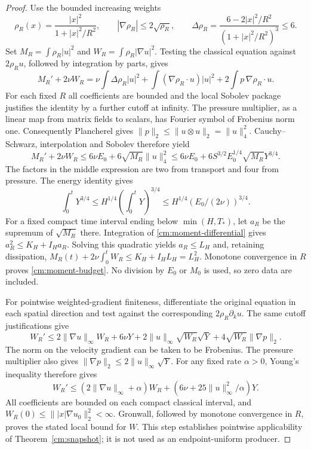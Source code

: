 \begin{proof}
Use the bounded increasing weights
\[
 \rho_R(x)=\frac{|x|^2}{1+|x|^2/R^2},\qquad
 |\nabla\rho_R|\le2\sqrt{\rho_R},\qquad
 \Delta\rho_R=\frac{6-2|x|^2/R^2}{(1+|x|^2/R^2)^3}\le6.
\]
Set $M_R=\int\rho_R|u|^2$ and $W_R=\int\rho_R|\nabla u|^2$.
Testing the classical equation against $2\rho_Ru$, followed by integration
by parts, gives
\[
 M_R'+2\nu W_R
 =\nu\int\Delta\rho_R|u|^2
   +\int(\nabla\rho_R\cdot u)|u|^2
   +2\int p\,\nabla\rho_R\cdot u.
\]
For each fixed $R$ all coefficients are bounded and the local Sobolev
package justifies the identity by a further cutoff at infinity.
The pressure multiplier, as a linear map from matrix fields to scalars,
has Fourier symbol of Frobenius norm one. Consequently Plancherel gives
$\|p\|_2\le\|u\otimes u\|_2=\|u\|_4^2$.
Cauchy--Schwarz, interpolation and Sobolev therefore yield
\begin{equation}\label{cm:moment-differential}
 M_R'+2\nu W_R
 \le6\nu E_0+6\sqrt{M_R}\|u\|_4^2
 \le6\nu E_0+6S^{3/2}E_0^{1/4}\sqrt{M_R}Y^{3/4}.
\end{equation}
The factors in the middle expression are two from transport and four
from pressure. The energy identity gives
\[
 \int_0^tY^{3/4}\le H^{1/4}\left(\int_0^tY\right)^{3/4}
 \le H^{1/4}(E_0/(2\nu))^{3/4}.
\]
For a fixed compact time interval ending below $\min(H,T_*)$, let
$a_R$ be the supremum of $\sqrt{M_R}$ there. Integration of
\eqref{cm:moment-differential} gives $a_R^2\le K_H+I_Ha_R$.
Solving this quadratic yields $a_R\le L_H$ and, retaining dissipation,
$M_R(t)+2\nu\int_0^tW_R\le K_H+I_HL_H=L_H^2$.
Monotone convergence in $R$ proves \eqref{cm:moment-budget}.
No division by $E_0$ or $M_0$ is used, so zero data are included.

For pointwise weighted-gradient finiteness, differentiate the original
equation in each spatial direction and test against the corresponding
$2\rho_R\partial_k u$. The same cutoff justifications give
\[
 W_R'\le 2\|\nabla u\|_\infty W_R+6\nu Y
      +2\|u\|_\infty\sqrt{W_R}\sqrt Y
      +4\sqrt{W_R}\|\nabla p\|_2.
\]
The norm on the velocity gradient can be taken to be Frobenius.
The pressure multiplier also gives
$\|\nabla p\|_2\le2\|u\|_\infty\sqrt Y$.
For any fixed rate $\alpha>0$, Young's inequality therefore gives
\[
 W_R'\le(2\|\nabla u\|_\infty+\alpha)W_R
       +(6\nu+25\|u\|_\infty^2/\alpha)Y.
\]
All coefficients are bounded on each compact classical interval, and
$W_R(0)\le\||x|\nabla u_0\|_2^2<\infty$. Gronwall, followed by monotone
convergence in $R$, proves the stated local bound for $W$.
This step establishes pointwise applicability of Theorem~\ref{cm:snapshot};
it is not used as an endpoint-uniform producer.
\end{proof}

